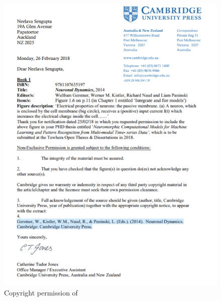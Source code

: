 \begin{figure}
	\centering
	\includegraphics[width=0.8\linewidth]{fig/copyrights/gerstner2014.PNG}
	\caption{Copyright permission of \citet{gerstner2014neuronal}}
\end{figure}

